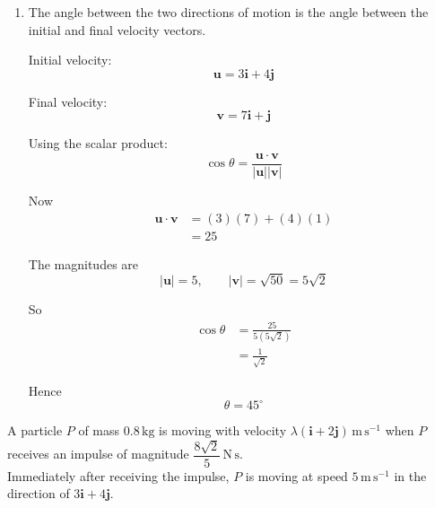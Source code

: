 \documentclass[leqno]{article}
\begin{document}
\begin{enumerate}[
  label=\textbf{\arabic*.},
  leftmargin=*,
  topsep=0pt,
  partopsep=0pt,
  parsep=0pt
]
\begin{djsSolution}
\begin{enumerate}[label=\textbf{(\alph*)}]
  Hence the final velocity is
  \begin{align*}
  \mathbf{v}
  &=\mathbf{u}+\mathbf{a}t \\
  &=(3\mathbf{i}+4\mathbf{j})+(4\mathbf{i}-3\mathbf{j}) \\
  &=7\mathbf{i}+\mathbf{j}
  \end{align*}

  Therefore the final speed is
  \[
  |\mathbf{v}|=\sqrt{7^2+1^2}=\sqrt{50}=5\sqrt{2}
  \]

  So the speed at the end of the interval is $5\sqrt{2}\,\mathrm{m\,s^{-1}} \approx 7.07\,\mathrm{m\,s^{-1}}$.

  \item The angle between the two directions of motion is the angle between the initial and final velocity vectors.

  Initial velocity:
  \[
  \mathbf{u}=3\mathbf{i}+4\mathbf{j}
  \]

  Final velocity:
  \[
  \mathbf{v}=7\mathbf{i}+\mathbf{j}
  \]

  Using the scalar product:
  \[
  \cos\theta=\frac{\mathbf{u}\cdot\mathbf{v}}{|\mathbf{u}||\mathbf{v}|}
  \]

  Now
  \begin{align*}
  \mathbf{u}\cdot\mathbf{v}
  &= (3)(7)+(4)(1) \\
  &= 25
  \end{align*}

  The magnitudes are
  \[
  |\mathbf{u}|=5, \qquad |\mathbf{v}|=\sqrt{50}=5\sqrt{2}
  \]

  So
  \begin{align*}
  \cos\theta
  &=\frac{25}{5(5\sqrt{2})} \\
  &=\frac{1}{\sqrt{2}}
  \end{align*}

  Hence
  \[
  \theta=45^\circ
  \]
\end{enumerate}
\end{djsSolution}


\newpage

\questionitem

A particle $P$ of mass $0.8\,\mathrm{kg}$ is moving with velocity $\lambda(\mathbf{i}+2\mathbf{j})\,\mathrm{m\,s^{-1}}$ when $P$ receives an impulse of magnitude $\dfrac{8\sqrt{2}}{5}\,\mathrm{N\,s}$. \\

Immediately after receiving the impulse, $P$ is moving at speed $5\,\mathrm{m\,s^{-1}}$ in the direction of $3\mathbf{i}+4\mathbf{j}$. \\


\end{enumerate}
\end{document}
